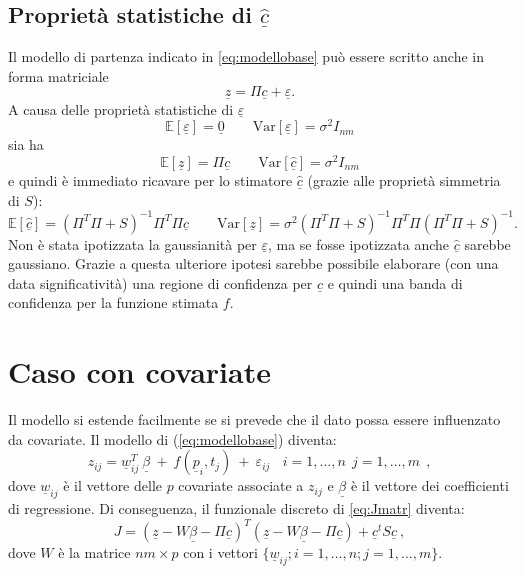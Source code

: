 \documentclass[a4paper,11pt,twoside,openright]{book}							%
\begin{document}
\subsection*{Proprietà statistiche di $\hat  {\underline c}$}
Il modello di partenza indicato in \ref{eq:modellobase} può essere scritto anche in forma matriciale
\begin{equation}
\label{eq:modellobasematric}
\underline z=\Pi \underline c + \underline \varepsilon .
\end{equation}
A causa delle proprietà statistiche di $\underline \varepsilon$
$$
\mathbb{E}[\underline \varepsilon] = \underline 0 \qquad \mathrm{Var}[\underline \varepsilon] = \sigma^2 I_{nm}
$$
sia ha
$$
\mathbb{E}[\underline z] = \Pi \underline c \qquad \mathrm{Var}[\hat  {\underline c}] = \sigma^2 I_{nm}
$$
e quindi è immediato ricavare per lo stimatore $\hat  {\underline c}$ (grazie alle proprietà simmetria di $S$):
$$
\mathbb{E}[\hat  {\underline c}] = (\Pi^T \Pi + S)^{-1}\Pi^T\Pi \underline c \qquad \mathrm{Var}[\underline z] = \sigma^2 (\Pi^T \Pi + S)^{-1}\Pi^T\Pi(\Pi^T \Pi + S)^{-1} .
$$
Non è stata ipotizzata la gaussianità per $\underline \varepsilon$, ma se fosse ipotizzata anche $\hat  {\underline c}$ sarebbe gaussiano. Grazie a questa ulteriore ipotesi sarebbe possibile elaborare (con una data significatività) una regione di confidenza per $\hat  {\underline c}$ e quindi una banda di confidenza per la funzione stimata $f$.


\section{Caso con covariate}

Il modello si estende facilmente se si prevede che il dato possa essere influenzato da covariate. Il modello di (\ref{eq:modellobase}) diventa:
\begin{equation}
\label{eq:modellobasecovar}
z_{ij}= \underline w_{ij}^T\  \underline \beta   \ + \  f(\underline p_i,t_j)\ +\ \varepsilon_{ij}\ \ \ \ i = 1,\ldots,n\ \ j=1,\ldots,m \ \ ,
\end{equation}
dove $\underline w_{ij}$ è il vettore delle $p$ covariate associate a $z_{ij}$ e $\underline \beta$ è il vettore dei coefficienti di regressione. Di conseguenza, il funzionale discreto di \ref{eq:Jmatr} diventa:
$$ J = (\underline z - W \underline \beta - \Pi \underline c)^T (\underline z - W \underline \beta - \Pi \underline c) + \underline c^t S \underline c  \ ,$$
dove $W$ è la matrice $nm \times p$ con i vettori $ \{\underline w_{ij}; i=1,\ldots,n;j=1,\ldots,m\}$.
\end{document}
